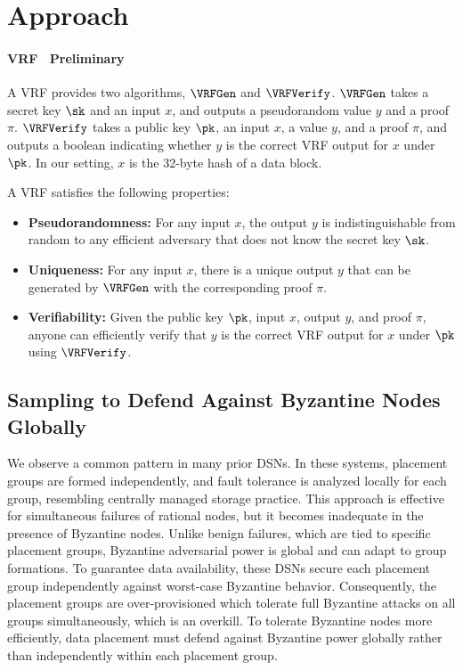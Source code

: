 \section{Approach}
\label{sec:approach}
\label{sec:approach:preliminary}

\paragraph{VRF~\cite{vrf,vrf-rfc} Preliminary}
A VRF provides two algorithms, $\VRFGen$ and $\VRFVerify$.
$\VRFGen$ takes a secret key $\sk$ and an input $x$, and outputs a pseudorandom value $y$ and a proof $\pi$.
$\VRFVerify$ takes a public key $\pk$, an input $x$, a value $y$, and a proof $\pi$, and outputs a boolean indicating whether $y$ is the correct VRF output for $x$ under $\pk$.
In our setting, $x$ is the 32-byte hash of a data block.

A VRF satisfies the following properties:
\begin{itemize}
    \item \textbf{Pseudorandomness:} For any input $x$, the output $y$ is indistinguishable from random to any efficient adversary that does not know the secret key $\sk$.
    \item \textbf{Uniqueness:} For any input $x$, there is a unique output $y$ that can be generated by $\VRFGen$ with the corresponding proof $\pi$.
    \item \textbf{Verifiability:} Given the public key $\pk$, input $x$, output $y$, and proof $\pi$, anyone can efficiently verify that $y$ is the correct VRF output for $x$ under $\pk$ using $\VRFVerify$.
\end{itemize}

\subsection{Sampling to Defend Against Byzantine Nodes Globally}
\label{sec:approach:sample}

We observe a common pattern in many prior DSNs.
In these systems, placement groups are formed independently, and fault tolerance is analyzed locally for each group, resembling centrally managed storage practice.
This approach is effective for simultaneous failures of rational nodes, but it becomes inadequate in the presence of Byzantine nodes.
Unlike benign failures, which are tied to specific placement groups, Byzantine adversarial power is global and can adapt to group formations.
To guarantee data availability, these DSNs secure each placement group independently against worst-case Byzantine behavior.
Consequently, the placement groups are over-provisioned which tolerate full Byzantine attacks on all groups simultaneously, which is an overkill.
To tolerate Byzantine nodes more efficiently, data placement must defend against Byzantine power globally rather than independently within each placement group.

